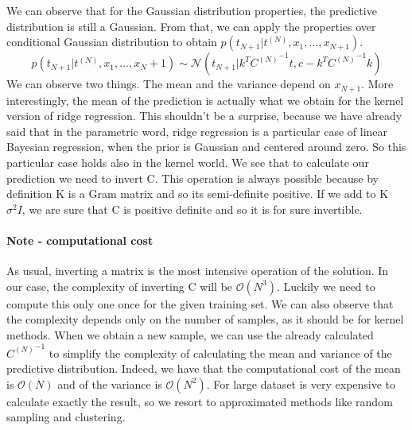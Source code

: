 \documentclass[main.tex]{subfiles}
\begin{document}
We can observe that for the Gaussian distribution properties, the predictive distribution is still a Gaussian. From that, we can apply the properties over conditional Gaussian distribution to obtain $p(t_{N+1}|t^{(N)},x_1,\dots,x_{N+1})$.
\begin{equation}
    p(t_{N+1}|t^{(N)},x_1,\dots,x_N+1) \sim \mathcal{N}(t_{N+1}|k^T {C^{(N)}}^{-1} t, c - k^T {C^{(N)}}^{-1} k)
\end{equation}
We can observe two things. The mean and the variance depend on $x_{N+1}$. More interestingly, the mean of the prediction is actually what we obtain for the kernel version of ridge regression. This shouldn't be a surprise, because we have already said that in the parametric word, ridge regression is a particular case of linear Bayesian regression, when the prior is Gaussian and centered around zero. So this particular case holds also in the kernel world.
We see that to calculate our prediction we need to invert C. This operation is always possible because by definition K is a Gram matrix and so its semi-definite positive. If we add to K $\sigma^2 I$, we are sure that C is positive definite and so it is for sure invertible.
\paragraph{Note - computational cost} As usual, inverting a matrix is the most intensive operation of the solution. In our case, the complexity of inverting C will be $\mathcal{O}(N^3)$. Luckily we need to compute this only one once for the given training set. We can also observe that the complexity depends only on the number of samples, as it should be for kernel methods. When we obtain a new sample, we can use the already calculated ${C^{(N)}}^{-1}$ to simplify the complexity of calculating the mean and variance of the predictive distribution. Indeed, we have that the computational cost of the mean is $\mathcal{O}(N)$ and of the variance is $\mathcal{O}(N^2)$. For large dataset is very expensive to calculate exactly the result, so we resort to approximated methods like random sampling and clustering.
\end{document}
